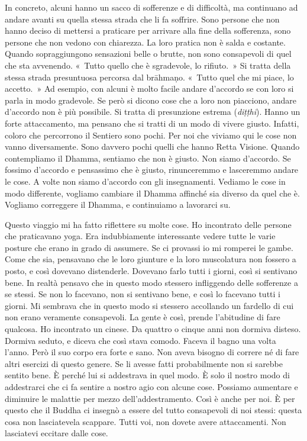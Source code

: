 In concreto, alcuni hanno un sacco di sofferenze e di difficoltà, ma
continuano ad andare avanti su quella stessa strada che li fa soffrire.
Sono persone che non hanno deciso di mettersi a praticare per arrivare
alla fine della sofferenza, sono persone che non vedono con chiarezza.
La loro pratica non è salda e costante. Quando sopraggiungono sensazioni
belle o brutte, non sono consapevoli di quel che sta avvenendo. «~Tutto
quello che è sgradevole, lo rifiuto.~» Si tratta della stessa strada
presuntuosa percorsa dal brāhmaṇo. «~Tutto quel che mi piace, lo
accetto.~» Ad esempio, con alcuni è molto facile andare d'accordo se con
loro si parla in modo gradevole. Se però si dicono cose che a loro non
piacciono, andare d'accordo non è più possibile. Si tratta di
presunzione estrema (\emph{diṭṭhi}). Hanno un forte attaccamento, ma
pensano che si tratti di un modo di vivere giusto. Infatti, coloro che
percorrono il Sentiero sono pochi. Per noi che viviamo qui le cose non
vanno diversamente. Sono davvero pochi quelli che hanno Retta Visione.
Quando contempliamo il Dhamma, sentiamo che non è giusto. Non siamo
d'accordo. Se fossimo d'accordo e pensassimo che è giusto, rinunceremmo
e lasceremmo andare le cose. A volte non siamo d'accordo con gli
insegnamenti. Vediamo le cose in modo differente, vogliamo cambiare il
Dhamma affinché sia diverso da quel che è. Vogliamo correggere il
Dhamma, e continuiamo a lavorarci su.

Questo viaggio mi ha fatto riflettere su molte cose. Ho incontrato delle
persone che praticavano yoga. Era indubbiamente interessante vedere
tutte le varie posture che erano in grado di assumere. Se ci provassi io
mi romperei le gambe. Come che sia, pensavano che le loro giunture e la
loro muscolatura non fossero a posto, e così dovevano distenderle.
Dovevano farlo tutti i giorni, così si sentivano bene. In realtà pensavo
che in questo modo stessero infliggendo delle sofferenze a se stessi. Se
non lo facevano, non si sentivano bene, e così lo facevano tutti i
giorni. Mi sembrava che in questo modo si stessero accollando un
fardello di cui non erano veramente consapevoli. La gente è così, prende
l'abitudine di fare qualcosa. Ho incontrato un cinese. Da quattro o
cinque anni non dormiva disteso. Dormiva seduto, e diceva che così stava
comodo. Faceva il bagno una volta l'anno. Però il suo corpo era forte e
sano. Non aveva bisogno di correre né di fare altri esercizi di questo
genere. Se li avesse fatti probabilmente non si sarebbe sentito bene. È
perché lui si addestrava in quel modo. È solo il nostro modo di
addestrarci che ci fa sentire a nostro agio con alcune cose. Possiamo
aumentare e diminuire le malattie per mezzo dell'addestramento. Così è
anche per noi. È per questo che il Buddha ci insegnò a essere del tutto
consapevoli di noi stessi: questa cosa non lasciatevela scappare. Tutti
voi, non dovete avere attaccamenti. Non lasciatevi eccitare dalle cose.

